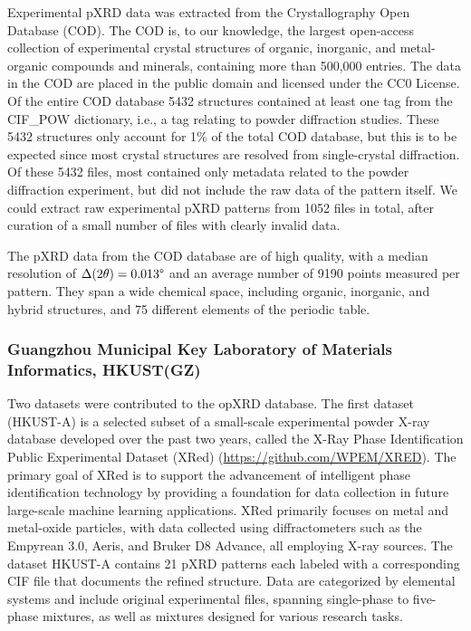 Experimental pXRD data was extracted from the Crystallography Open Database (COD)\cite{Grazulis2009, Vaitkus2023}. The COD is, to our knowledge, the largest open-access collection of experimental crystal structures of organic, inorganic, and metal-organic compounds and minerals, containing more than 500,000 entries. The data in the COD are placed in the public domain and licensed under the CC0 License. Of the entire COD database 5432 structures contained at least one tag from the {CIF\_POW} dictionary, i.e., a tag relating to powder diffraction studies. These 5432 structures only account for 1\% of the total COD database, but this is to be expected since most crystal structures are resolved from single-crystal diffraction. Of these 5432 files, most contained only metadata related to the powder diffraction experiment, but did not include the raw data of the pattern itself. We could extract raw experimental pXRD patterns from 1052 files in total, after curation of a small number of files with clearly invalid data.

The pXRD data from the COD database are of high quality, with a median resolution of $\Delta(2\theta) = 0.013\degree$ and an average number of 9190 points measured per pattern. They span a wide chemical space, including organic, inorganic, and hybrid structures, and 75 different elements of the periodic table.

\subsubsection*{Guangzhou Municipal Key Laboratory of Materials Informatics, HKUST(GZ)}

Two datasets were contributed to the opXRD database. The first dataset (HKUST-A) is a selected subset of a small-scale experimental powder X-ray database developed over the past two years, called the X-Ray Phase Identification Public Experimental Dataset (XRed) (\url{https://github.com/WPEM/XRED}). The primary goal of XRed is to support the advancement of intelligent phase identification technology by providing a foundation for data collection in future large-scale machine learning applications. XRed primarily focuses on metal and metal-oxide particles, with data collected using diffractometers such as the Empyrean 3.0, Aeris, and Bruker D8 Advance, all employing  X-ray sources. The dataset HKUST-A contains 21 pXRD patterns each labeled with a corresponding CIF file that documents the refined structure. Data are categorized by elemental systems and include original experimental files, spanning single-phase to five-phase mixtures, as well as mixtures designed for various research tasks.

